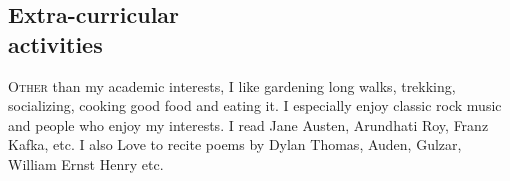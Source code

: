 \documentclass[margin,line]{res}
\begin{document}
\begin{resume}
\section{\sc Extra-curricular \\ activities}
\lettrine[lines=2]{O}{ther} than my academic interests, I like gardening long walks, trekking, socializing, cooking good food and eating it. I especially enjoy classic rock music and people who enjoy my interests. I read Jane Austen, Arundhati Roy, Franz Kafka, etc. I also Love to recite poems by Dylan Thomas, Auden, Gulzar, William Ernst Henry etc.





\end{resume}
\end{document}
